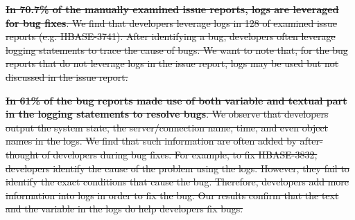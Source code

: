 \documentclass[conference]{IEEEtran}
\providecommand{\DIFdel}[1]{{\protect\color{red}\sout{#1}}}                      %
\begin{document}


\DIFdel{\textbf{In 70.7\% of the manually examined issue reports, logs are leveraged for bug fixes}. We find that developers leverage logs in 128 of examined issue reports (e.g. HBASE-3741). After identifying a bug, developers often leverage logging statements to trace the cause of bugs. %
We want to note that, for the bug reports that do not leverage logs in the issue report, logs may  be used but not discussed in the issue report. 
}%



\DIFdel{\textbf{In 61\% of the bug reports made use of both variable and textual part in the logging statements to resolve bugs}. We observe that developers output the system state, the server/connection name, time, and even object names in the logs. We find that such information are often added by after-thought of developers during bug fixes. For example, to fix HBASE-3832, developers identify the cause of the problem using the logs. However, they fail to identify the exact conditions that cause the bug. Therefore, developers add more information into logs in order to fix the bug. Our results confirm that the text and the variable in the logs do help developers fix bugs.}%

\end{document}
